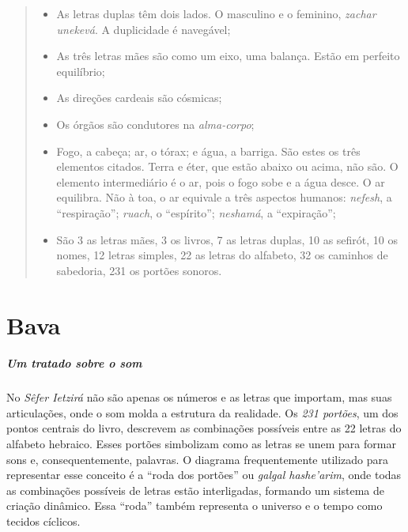 \asterisc

\begin{quote}
\begin{itemize}
\item{}\quad As letras duplas têm dois lados. O masculino e o feminino, \textit{zachar unekevá}. A duplicidade é navegável;\\
\item{}\quad As três letras mães são como um eixo, uma balança. Estão em perfeito equilíbrio;\\
\item{}\quad As direções cardeais são cósmicas;\\
\item{}\quad Os órgãos são condutores na \textit{alma-corpo};\\
\item{}\quad Fogo, a cabeça; ar, o tórax; e água, a barriga. São estes os três elementos citados. Terra e éter, que estão abaixo ou acima, não são. O elemento intermediário é o ar, pois o fogo sobe e a água desce. O ar equilibra. Não à toa, o ar equivale a três aspectos humanos: \textit{nefesh}, a ``respiração''; \textit{ruach}, o ``espírito''; \textit{neshamá}, a ``expiração'';\\
\item{}\quad São 3 as letras mães, 3 os livros, 7 as letras duplas, 10 as sefirót, 10 os nomes, 12 letras simples, 22 as letras do alfabeto, 32 os caminhos de sabedoria, 231 os portões sonoros. 
\end{itemize}
\end{quote}

\chapter*{Bava \smallskip{}}

\begin{center}
{\huge{}}
\end{center}

\paragraph{Um tratado sobre o som} No \textit{Sêfer Ietzirá} não são apenas os números e as letras que importam, mas suas articulações, onde o som molda a estrutura da realidade. Os \textit{231 portões}, um dos pontos centrais do livro, descrevem as combinações possíveis entre as 22 letras do alfabeto hebraico. Esses portões simbolizam como as letras se unem para formar sons e, consequentemente, palavras. O diagrama frequentemente utilizado para representar esse conceito é a ``roda dos portões'' ou \textit{galgal hashe'arim}, onde todas as combinações possíveis de letras estão interligadas, formando um sistema de criação dinâmico. Essa ``roda'' também representa o universo e o tempo como tecidos cíclicos.

